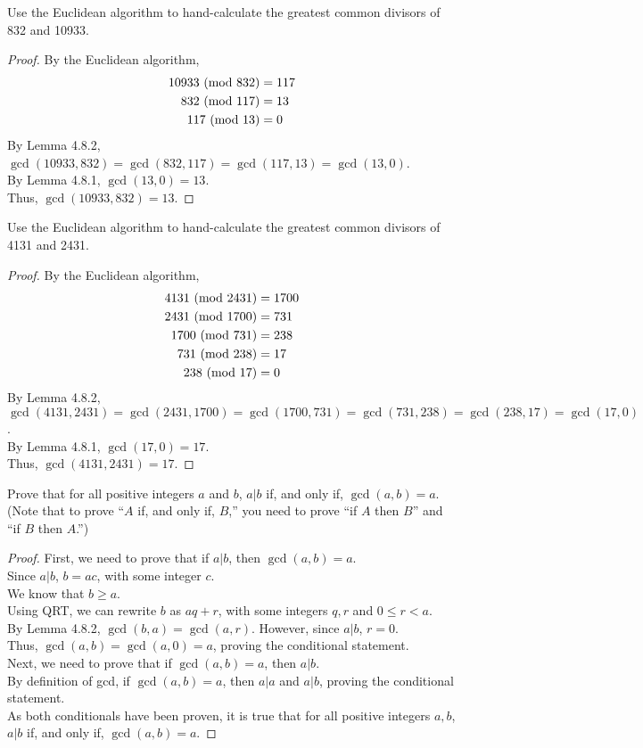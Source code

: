 \documentclass[name=Ojas\ Chaturvedi, emailid=oj.chaturvedi.2024, course=Capstone:\ Discrete\ Math, num=8, deadline={November\ 2,\ 2023}]{homework}
\begin{document}
Use the Euclidean algorithm to hand-calculate the greatest common divisors of 832 and 10933.
\begin{proof}
    By the Euclidean algorithm,
    \begin{align*}
        10933 \ (\mathrm{mod}\ 832) &= 117 \\
        832 \ (\mathrm{mod}\ 117) &= 13 \\
        117 \ (\mathrm{mod}\ 13) &= 0
    \end{align*}
    By Lemma 4.8.2, $\gcd(10933,832) = \gcd(832,117) = \gcd(117,13) = \gcd(13,0)$. \\
    By Lemma 4.8.1, $\gcd(13,0) = 13$. \\
    Thus, $\gcd(10933,832) = 13$.
\end{proof}

Use the Euclidean algorithm to hand-calculate the greatest common divisors of 4131 and 2431.
\begin{proof}
    By the Euclidean algorithm,
    \begin{align*}
        4131 \ (\mathrm{mod}\ 2431) &= 1700 \\
        2431 \ (\mathrm{mod}\ 1700) &= 731 \\
        1700 \ (\mathrm{mod}\ 731) &= 238 \\
        731 \ (\mathrm{mod}\ 238) &= 17 \\
        238 \ (\mathrm{mod}\ 17) &= 0
    \end{align*}
    By Lemma 4.8.2, $\gcd(4131,2431) = \gcd(2431,1700) = \gcd(1700,731) = \gcd(731,238) = \gcd(238,17) = \gcd(17,0)$. \\
    By Lemma 4.8.1, $\gcd(17,0) = 17$. \\
    Thus, $\gcd(4131,2431) = 17$.
\end{proof}

Prove that for all positive integers $a$ and $b$, $a | b$ if, and only if, $\gcd(a,b) = a$. (Note that to prove ``$A$ if, and only if, $B$,'' you need to prove ``if $A$ then $B$'' and ``if $B$ then $A$.'')
\begin{proof}
    First, we need to prove that if $a | b$, then $\gcd(a, b) = a$. \\
    Since $a|b$, $b = ac$, with some integer $c$. \\
    We  know that $b\geq a$. \\
    Using QRT, we can rewrite $b$ as $aq + r$, with some integers $q, r$ and $0\leq r < a$. \\
    By Lemma 4.8.2, $\gcd(b, a) = \gcd(a, r)$. However, since $a | b$, $r = 0$. \\
    Thus, $\gcd(a, b) = \gcd(a, 0) = a$, proving the conditional statement. \\
    Next, we need to prove that if $\gcd(a, b) = a$, then $a | b$. \\
    By definition of gcd, if $\gcd(a, b) = a$, then $a | a$ and $a | b$, proving the conditional statement. \\
    As both conditionals have been proven, it is true that for all positive integers $a, b$, $a | b$ if, and only if, $\gcd(a, b) = a$.
\end{proof}
\end{document}
